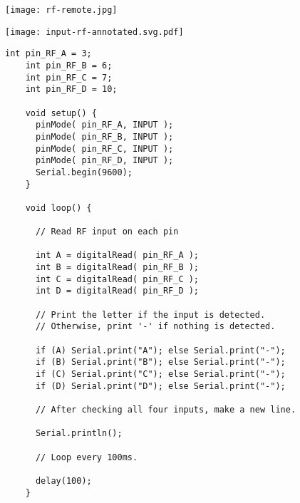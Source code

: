 \vspace{0.1in}
\begin{minipage}[t]{0.49\tw}

  \vspace{0.1in}
  \texttt{[image: rf-remote.jpg]}

  \vspace{0.1in}
  \texttt{[image: input-rf-annotated.svg.pdf]}

\end{minipage}
\hfill
\begin{minipage}[t]{0.49\tw}
  \vspace{0.1in}
  \begin{Verbatim}[gobble=3,fontsize=\small]
    int pin_RF_A = 3;
    int pin_RF_B = 6;
    int pin_RF_C = 7;
    int pin_RF_D = 10;

    void setup() {
      pinMode( pin_RF_A, INPUT );
      pinMode( pin_RF_B, INPUT );
      pinMode( pin_RF_C, INPUT );
      pinMode( pin_RF_D, INPUT );
      Serial.begin(9600);
    }

    void loop() {

      // Read RF input on each pin

      int A = digitalRead( pin_RF_A );
      int B = digitalRead( pin_RF_B );
      int C = digitalRead( pin_RF_C );
      int D = digitalRead( pin_RF_D );

      // Print the letter if the input is detected.
      // Otherwise, print '-' if nothing is detected.

      if (A) Serial.print("A"); else Serial.print("-");
      if (B) Serial.print("B"); else Serial.print("-");
      if (C) Serial.print("C"); else Serial.print("-");
      if (D) Serial.print("D"); else Serial.print("-");

      // After checking all four inputs, make a new line.

      Serial.println();

      // Loop every 100ms.

      delay(100);
    }
  \end{Verbatim}
\end{minipage}
\vspace{0.1in}

